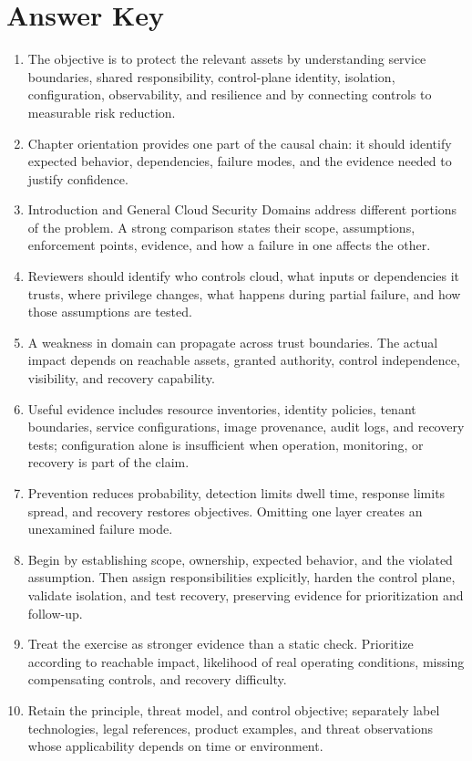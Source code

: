 \documentclass[11pt]{article}
\begin{document}
\section*{Answer Key}
\begin{enumerate}
\item The objective is to protect the relevant assets by understanding service boundaries, shared responsibility, control-plane identity, isolation, configuration, observability, and resilience and by connecting controls to measurable risk reduction.
\item Chapter orientation provides one part of the causal chain: it should identify expected behavior, dependencies, failure modes, and the evidence needed to justify confidence.
\item Introduction and General Cloud Security Domains address different portions of the problem. A strong comparison states their scope, assumptions, enforcement points, evidence, and how a failure in one affects the other.
\item Reviewers should identify who controls cloud, what inputs or dependencies it trusts, where privilege changes, what happens during partial failure, and how those assumptions are tested.
\item A weakness in domain can propagate across trust boundaries. The actual impact depends on reachable assets, granted authority, control independence, visibility, and recovery capability.
\item Useful evidence includes resource inventories, identity policies, tenant boundaries, service configurations, image provenance, audit logs, and recovery tests; configuration alone is insufficient when operation, monitoring, or recovery is part of the claim.
\item Prevention reduces probability, detection limits dwell time, response limits spread, and recovery restores objectives. Omitting one layer creates an unexamined failure mode.
\item Begin by establishing scope, ownership, expected behavior, and the violated assumption. Then assign responsibilities explicitly, harden the control plane, validate isolation, and test recovery, preserving evidence for prioritization and follow-up.
\item Treat the exercise as stronger evidence than a static check. Prioritize according to reachable impact, likelihood of real operating conditions, missing compensating controls, and recovery difficulty.
\item Retain the principle, threat model, and control objective; separately label technologies, legal references, product examples, and threat observations whose applicability depends on time or environment.
\end{enumerate}
\end{document}
